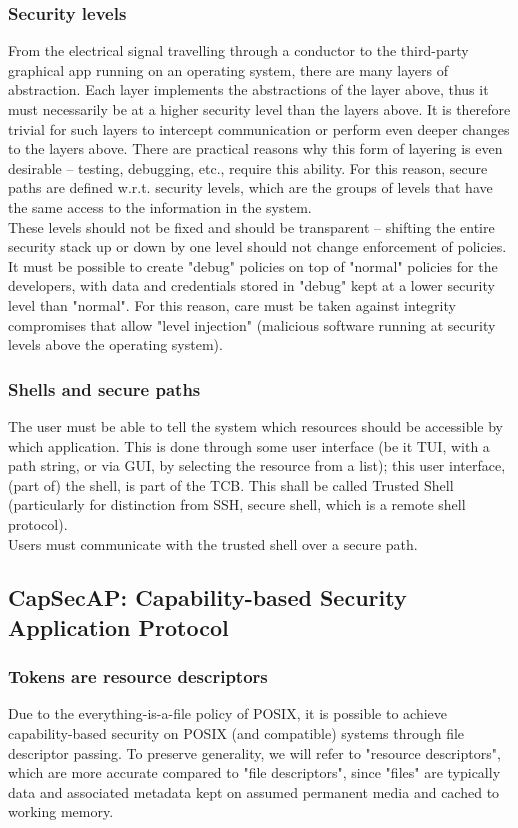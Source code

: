 \subsubsection{Security levels}
From the electrical signal travelling through a conductor to the third-party graphical app running on an operating system, there are many layers of abstraction. Each layer implements the abstractions of the layer above, thus it must necessarily be at a higher security level than the layers above. It is therefore trivial for such layers to intercept communication or perform even deeper changes to the layers above. There are practical reasons why this form of layering is even desirable -- testing, debugging, etc., require this ability. For this reason, secure paths are defined w.r.t. security levels, which are the groups of levels that have the same access to the information in the system.\\
These levels should not be fixed and should be transparent -- shifting the entire security stack up or down by one level should not change enforcement of policies. It must be possible to create "debug" policies on top of "normal" policies for the developers, with data and credentials stored in "debug" kept at a lower security level than "normal". For this reason, care must be taken against integrity compromises that allow "level injection" (malicious software running at security levels above the operating system).
\subsubsection{Shells and secure paths}
The user must be able to tell the system which resources should be accessible by which application. This is done through some user interface (be it TUI, with a path string, or via GUI, by selecting the resource from a list); this user interface, (part of) the shell, is part of the TCB. This shall be called Trusted Shell (particularly for distinction from SSH, secure shell, which is a remote shell protocol).\\
Users must communicate with the trusted shell over a secure path.
\subsection{CapSecAP: Capability-based Security Application Protocol}
\subsubsection{Tokens are resource descriptors}
Due to the everything-is-a-file policy of POSIX, it is possible to achieve capability-based security on POSIX (and compatible) systems through file descriptor passing. To preserve generality, we will refer to "resource descriptors", which are more accurate compared to "file descriptors", since "files" are typically data and associated metadata kept on assumed permanent media and cached to working memory.
